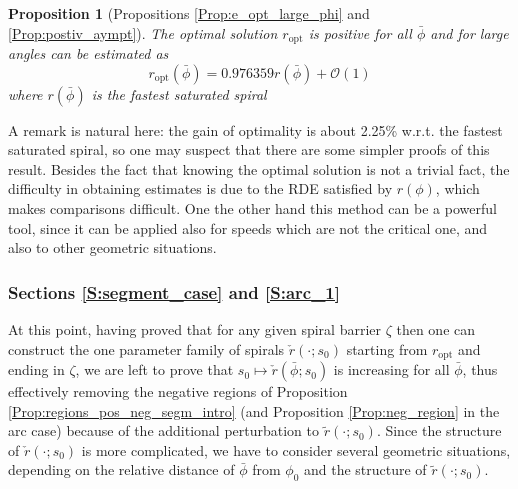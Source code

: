 \documentclass[reqno]{amsart}
\theoremstyle{definition} \newtheorem{definition}{Definition}[section]
\theoremstyle{definition} \newtheorem{remark}[definition]{Remark}
\theoremstyle{plain} \newtheorem{lemma}[definition]{Lemma}
\theoremstyle{plain} \newtheorem{proposition}[definition]{Proposition}
\theoremstyle{plain} \newtheorem{theorem}[definition]{Theorem}
\theoremstyle{plain} \newtheorem{corollary}[definition]{Corollary}
\theoremstyle{definition} \newtheorem{example}[definition]{Example}
\theoremstyle{plain} \newtheorem{claim}[clai]{Claim}
\theoremstyle{definition} \newtheorem{assumption}[definition]{Assumption}
\theoremstyle{definition} \newtheorem{observation}[definition]{Observation}
\newcommand{\1}{\mathbbm 1}
\numberwithin{equation}{section} %
\theoremstyle{plain} \newtheorem*{theorem*}{Theorem}
\theoremstyle{plain} \newtheorem{mthm}[maintheorem]{Main Theorem}
\theoremstyle{plain} \newtheorem*{mthm*}{Main Theorem}
\theoremstyle{plain} \newtheorem*{conjecture*}{Conjecture}
\theoremstyle{plain} \newtheorem{conjecture}[definition]{Conjecture}
\theoremstyle{plain} \newtheorem*{problem*}{Problem}
\begin{document}
\begin{proposition}[Propositions \ref{Prop:e_opt_large_phi} and \ref{Prop:postiv_aympt}]
\label{Prop:e_opt_large_phi_intro}
The optimal solution $r_\mathrm{opt}$ is positive for all $\bar \phi$ and for large angles can be estimated as %
\begin{equation*}
r_\mathrm{opt}(\bar \phi) = 0.976359 r(\bar \phi) + \mathcal O(1)
\end{equation*}
where $r(\bar \phi)$ is the fastest saturated spiral
\end{proposition}

A remark is natural here: the gain of optimality is about 2.25\% w.r.t. the fastest saturated spiral, so one may suspect that there are some simpler proofs of this result. Besides the fact that knowing the optimal solution is not a trivial fact, the difficulty in obtaining estimates is due to the RDE satisfied by $r(\phi)$, which makes comparisons difficult. One the other hand this method  can be a powerful tool, since it can be applied also for speeds which are not the critical one, and also to other geometric situations.


\subsubsection{Sections \ref{S:segment_case} and \ref{S:arc_1}}
\label{Sss:final_case_opt_intro}


At this point, having proved that for any given spiral barrier $\zeta$ then one can construct the one parameter family of spirals $\check r(\cdot;s_0)$ starting from $r_\mathrm{opt}$ and ending in $\zeta$, we are left to prove that $s_0 \mapsto \check r(\bar \phi;s_0)$ is increasing for all $\bar \phi$, thus effectively removing the negative regions of Proposition \ref{Prop:regions_pos_neg_segm_intro} (and Proposition \ref{Prop:neg_region} in the arc case) because of the additional perturbation to $\tilde r(\cdot;s_0)$. Since the structure of $\check r(\cdot;s_0)$ is more complicated, we have to consider several geometric situations, depending on the relative distance of $\bar \phi$ from $\phi_0$ and the structure of $\tilde r(\cdot;s_0)$.
\end{document}
